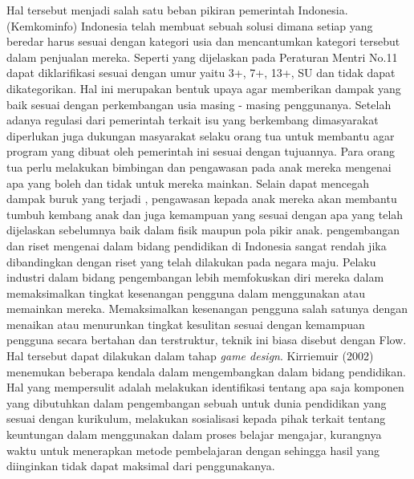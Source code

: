 \linebreak\linebreak
Hal tersebut menjadi salah satu beban pikiran pemerintah Indonesia. \kemkominfo (Kemkominfo) Indonesia telah membuat sebuah solusi dimana setiap \game yang beredar harus sesuai dengan kategori usia dan mencantumkan kategori tersebut dalam penjualan \game mereka. Seperti yang dijelaskan pada Peraturan Mentri No.11 \game dapat diklarifikasi sesuai dengan umur yaitu 3+, 7+, 13+, SU dan tidak dapat dikategorikan. Hal ini merupakan bentuk upaya agar \game memberikan dampak yang baik sesuai dengan perkembangan usia masing - masing penggunanya.
\linebreak\linebreak
Setelah adanya regulasi dari pemerintah terkait isu yang berkembang dimasyarakat diperlukan juga dukungan masyarakat selaku orang tua untuk membantu agar program yang dibuat oleh pemerintah ini sesuai dengan tujuannya. Para orang tua perlu melakukan bimbingan dan pengawasan pada anak mereka mengenai \game apa yang boleh dan tidak untuk mereka mainkan. Selain dapat mencegah dampak buruk yang terjadi , pengawasan kepada anak mereka akan membantu tumbuh kembang anak dan juga kemampuan yang sesuai dengan apa yang telah dijelaskan sebelumnya baik dalam fisik maupun pola pikir anak.
\linebreak\linebreak
pengembangan dan riset mengenai \game dalam bidang pendidikan di Indonesia sangat rendah jika dibandingkan dengan riset yang telah dilakukan pada negara maju. Pelaku industri dalam bidang pengembangan \game lebih memfokuskan diri mereka dalam memaksimalkan tingkat kesenangan pengguna dalam menggunakan atau memainkan \game mereka. Memaksimalkan kesenangan pengguna salah satunya dengan menaikan atau menurunkan tingkat kesulitan sesuai dengan kemampuan pengguna secara bertahan dan terstruktur, teknik ini biasa disebut dengan Flow. Hal tersebut dapat dilakukan dalam tahap \textit{game design}.
\linebreak\linebreak
Kirriemuir (2002) menemukan beberapa kendala dalam mengembangkan \game dalam bidang pendidikan. Hal yang mempersulit adalah melakukan identifikasi tentang apa saja komponen yang dibutuhkan dalam pengembangan sebuah \game untuk dunia pendidikan yang sesuai dengan kurikulum, melakukan sosialisasi kepada pihak terkait tentang keuntungan dalam menggunakan \game dalam proses belajar mengajar, kurangnya waktu untuk menerapkan metode pembelajaran dengan \game sehingga hasil yang diinginkan tidak dapat maksimal dari penggunakanya.



